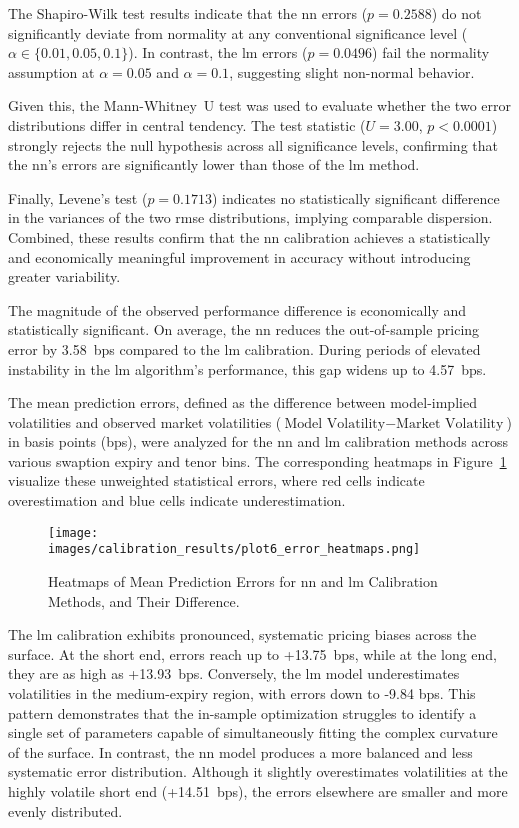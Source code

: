 The Shapiro-Wilk test results indicate that the \ac{nn} errors (\(p=0.2588\)) do not significantly deviate from normality at any conventional significance level (\(\alpha \in \{0.01, 0.05, 0.1\}\)). In contrast, the \ac{lm} errors (\(p=0.0496\)) fail the normality assumption at \(\alpha=0.05\) and \(\alpha=0.1\), suggesting slight non-normal behavior.

Given this, the Mann-Whitney~U test was used to evaluate whether the two error distributions differ in central tendency. The test statistic (\(U=3.00\), \(p<0.0001\)) strongly rejects the null hypothesis across all significance levels, confirming that the \ac{nn}'s errors are significantly lower than those of the \ac{lm} method.

Finally, Levene's test (\(p=0.1713\)) indicates no statistically significant difference in the variances of the two \ac{rmse} distributions, implying comparable dispersion. Combined, these results confirm that the \ac{nn} calibration achieves a statistically and economically meaningful improvement in accuracy without introducing greater variability.

The magnitude of the observed performance difference is economically and statistically significant. On average, the \ac{nn} reduces the out-of-sample pricing error by 3.58~\ac{bps} compared to the \ac{lm} calibration. During periods of elevated instability in the \ac{lm} algorithm's performance, this gap widens up to 4.57~\ac{bps}.

The mean prediction errors, defined as the difference between model-implied volatilities and observed market volatilities (\(\text{Model Volatility} - \text{Market Volatility}\)) in basis points (\ac{bps}), were analyzed for the \ac{nn} and \ac{lm} calibration methods across various swaption expiry and tenor bins. The corresponding heatmaps in Figure~\ref{fig:error_heatmaps} visualize these unweighted statistical errors, where red cells indicate overestimation and blue cells indicate underestimation.

\begin{figure}[H]
	\centering
	\texttt{[image: images/calibration\_results/plot6\_error\_heatmaps.png]}
	\caption{Heatmaps of Mean Prediction Errors for \ac{nn} and \ac{lm} Calibration Methods, and Their Difference.}
	\label{fig:error_heatmaps}
\end{figure}

The \ac{lm} calibration exhibits pronounced, systematic pricing biases across the surface. At the short end, errors reach up to +13.75~\ac{bps}, while at the long end, they are as high as +13.93~\ac{bps}. Conversely, the \ac{lm} model underestimates volatilities in the medium-expiry region, with errors down to -9.84 \ac{bps}. This pattern demonstrates that the in-sample optimization struggles to identify a single set of parameters capable of simultaneously fitting the complex curvature of the surface. In contrast, the \ac{nn} model produces a more balanced and less systematic error distribution. Although it slightly overestimates volatilities at the highly volatile short end (+14.51~\ac{bps}), the errors elsewhere are smaller and more evenly distributed.

